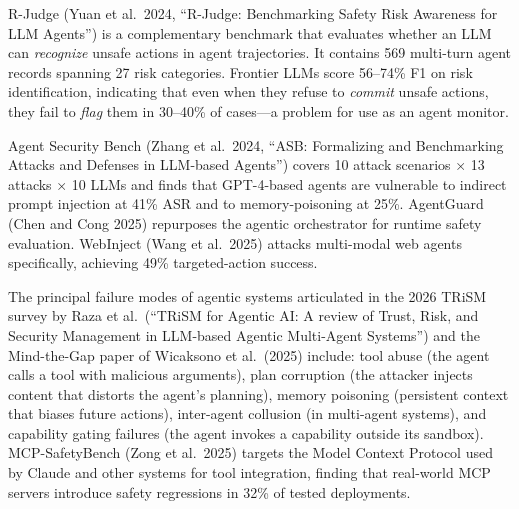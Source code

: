 R-Judge (Yuan et al.~2024, ``R-Judge: Benchmarking Safety Risk Awareness for LLM Agents'') is a complementary benchmark that evaluates whether an LLM can \emph{recognize} unsafe actions in agent trajectories. It contains 569 multi-turn agent records spanning 27 risk categories. Frontier LLMs score 56--74\% F1 on risk identification, indicating that even when they refuse to \emph{commit} unsafe actions, they fail to \emph{flag} them in 30--40\% of cases---a problem for use as an agent monitor.

Agent Security Bench (Zhang et al.~2024, ``ASB: Formalizing and Benchmarking Attacks and Defenses in LLM-based Agents'') covers 10 attack scenarios × 13 attacks × 10 LLMs and finds that GPT-4-based agents are vulnerable to indirect prompt injection at 41\% ASR and to memory-poisoning at 25\%. AgentGuard (Chen and Cong 2025) repurposes the agentic orchestrator for runtime safety evaluation. WebInject (Wang et al.~2025) attacks multi-modal web agents specifically, achieving 49\% targeted-action success.

The principal failure modes of agentic systems articulated in the 2026 TRiSM survey by Raza et al.~(``TRiSM for Agentic AI: A review of Trust, Risk, and Security Management in LLM-based Agentic Multi-Agent Systems'') and the Mind-the-Gap paper of Wicaksono et al.~(2025) include: tool abuse (the agent calls a tool with malicious arguments), plan corruption (the attacker injects content that distorts the agent's planning), memory poisoning (persistent context that biases future actions), inter-agent collusion (in multi-agent systems), and capability gating failures (the agent invokes a capability outside its sandbox). MCP-SafetyBench (Zong et al.~2025) targets the Model Context Protocol used by Claude and other systems for tool integration, finding that real-world MCP servers introduce safety regressions in 32\% of tested deployments.

